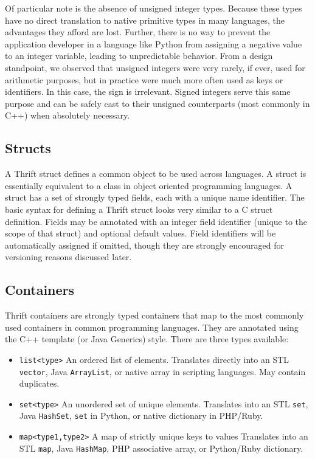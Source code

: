 \documentclass[nocopyrightspace,blockstyle]{sigplanconf}
\begin{document}
Of particular note is the absence of unsigned integer types. Because these
types have no direct translation to native primitive types in many languages,
the advantages they afford are lost. Further, there is no way to prevent the
application developer in a language like Python from assigning a negative value
to an integer variable, leading to unpredictable behavior. From a design
standpoint, we observed that unsigned integers were very rarely, if ever, used
for arithmetic purposes, but in practice were much more often used as keys or
identifiers. In this case, the sign is irrelevant. Signed integers serve this
same purpose and can be safely cast to their unsigned counterparts (most
commonly in C++) when absolutely necessary.

\subsection{Structs}

A Thrift struct defines a common object to be used across languages. A struct
is essentially equivalent to a class in object oriented programming
languages. A struct has a set of strongly typed fields, each with a unique
name identifier. The basic syntax for defining a Thrift struct looks very
similar to a C struct definition. Fields may be annotated with an integer field
identifier (unique to the scope of that struct) and optional default values.
Field identifiers will be automatically assigned if omitted, though they are
strongly encouraged for versioning reasons discussed later.

\subsection{Containers}

Thrift containers are strongly typed containers that map to the most commonly
used containers in common programming languages. They are annotated using
the C++ template (or Java Generics) style. There are three types available:
\begin{itemize}
\item \texttt{list<type>} An ordered list of elements. Translates directly into
an STL \texttt{vector}, Java \texttt{ArrayList}, or native array in scripting languages. May
contain duplicates.
\item \texttt{set<type>} An unordered set of unique elements. Translates into
an STL \texttt{set}, Java \texttt{HashSet}, \texttt{set} in Python, or native
dictionary in PHP/Ruby. 
\item \texttt{map<type1,type2>} A map of strictly unique keys to values
Translates into an STL \texttt{map}, Java \texttt{HashMap}, PHP associative
array, or Python/Ruby dictionary.
\end{itemize}
\end{document}
